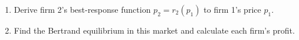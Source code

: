 \documentclass[11pt]{article}
\begin{document}
\begin{enumerate}
\begin{enumerate}
    \item Derive firm 2's best-response function $p_{2}=r_{2}(p_{1})$ to firm 1's price $p_{1}$.

	\item Find the Bertrand equilibrium in this market and calculate each firm's profit.

	\end{enumerate}

\end{enumerate}
\end{document}
